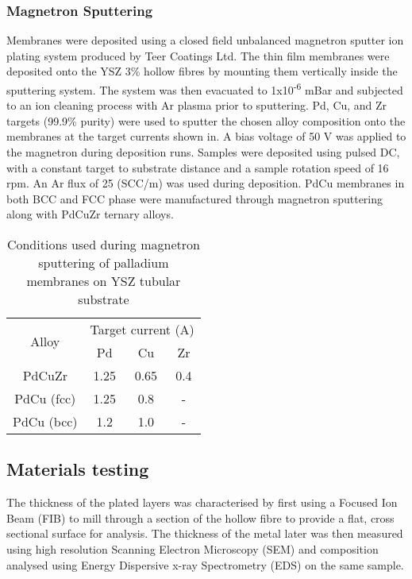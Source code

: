 \subsubsection{Magnetron Sputtering}
Membranes were deposited using a closed field unbalanced magnetron sputter ion plating system produced by Teer Coatings Ltd. The thin film membranes were deposited onto the YSZ 3\% hollow fibres by mounting them vertically inside the sputtering system. The system was then evacuated to 1x10\textsuperscript{-6} mBar and subjected to an ion cleaning process with Ar plasma prior to sputtering. Pd, Cu, and Zr targets (99.9\% purity) were used to sputter the chosen alloy composition onto the membranes at the target currents shown in. A bias voltage of 50 V was applied to the magnetron during deposition runs. Samples were deposited using pulsed DC, with a constant target to substrate distance and a sample rotation speed of 16 rpm. An Ar flux of 25 (SCC/m) was used during deposition. PdCu membranes in both BCC and FCC phase were manufactured through magnetron sputtering along with PdCuZr ternary alloys. 

\begin{table}[]
    \centering
    \caption{Conditions used during magnetron sputtering of palladium membranes on YSZ tubular substrate}
    \label{sputtering}
    \begin{tabular}{@{}cccc@{}}
    \toprule
    \multirow{2}{*}{Alloy} & \multicolumn{3}{c}{Target current (A)} \\
                           & Pd          & Cu          & Zr         \\ \midrule
    PdCuZr                 & 1.25        & 0.65        & 0.4        \\
    PdCu (fcc)             & 1.25        & 0.8         & -          \\
    PdCu (bcc)             & 1.2         & 1.0         & -          \\ \bottomrule
    \end{tabular}
    \end{table}

\subsection{Materials testing}\label{MatTest}
The thickness of the plated layers was characterised by first using a Focused Ion Beam (FIB) to mill through a section of the hollow fibre to provide a flat, cross sectional surface for analysis. The thickness of the metal later was then measured using high resolution Scanning Electron Microscopy (SEM) and composition analysed using Energy Dispersive x-ray Spectrometry (EDS) on the same sample. 

